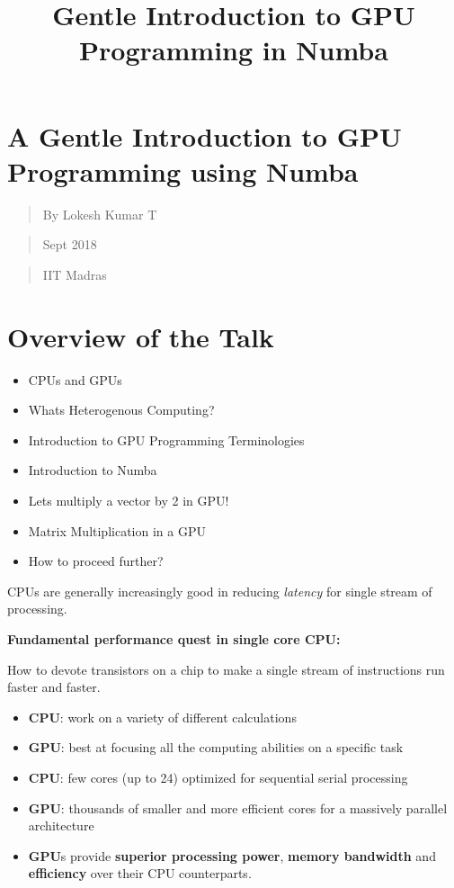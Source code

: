 \documentclass[11pt]{article}
\title{Gentle Introduction to GPU Programming in Numba}
\providecommand{\tightlist}{%
      \setlength{\itemsep}{0pt}\setlength{\parskip}{0pt}}
\begin{document}
    
    
    \maketitle
    
    

    
    \section{A Gentle Introduction to GPU Programming using
Numba}\label{a-gentle-introduction-to-gpu-programming-using-numba}

\begin{quote}
By Lokesh Kumar T
\end{quote}

\begin{quote}
Sept 2018
\end{quote}

\begin{quote}
IIT Madras
\end{quote}

    \section{Overview of the Talk}\label{overview-of-the-talk}

\begin{itemize}
\tightlist
\item
  CPUs and GPUs
\item
  Whats Heterogenous Computing?
\item
  Introduction to GPU Programming Terminologies
\item
  Introduction to Numba
\item
  Lets multiply a vector by 2 in GPU!
\item
  Matrix Multiplication in a GPU
\item
  How to proceed further?
\end{itemize}

    CPUs are generally increasingly good in reducing \emph{latency} for
single stream of processing.

\textbf{Fundamental performance quest in single core CPU:}

How to devote transistors on a chip to make a single stream of
instructions run faster and faster.

    \begin{itemize}
\tightlist
\item
  \textbf{CPU}: work on a variety of different calculations
\item
  \textbf{GPU}: best at focusing all the computing abilities on a
  specific task
\item
  \textbf{CPU}: few cores (up to 24) optimized for sequential serial
  processing
\item
  \textbf{GPU}: thousands of smaller and more efficient cores for a
  massively parallel architecture
\item
  \textbf{GPU}s provide \textbf{superior processing power},
  \textbf{memory bandwidth} and \textbf{efficiency} over their CPU
  counterparts.
\end{itemize}
\end{document}
